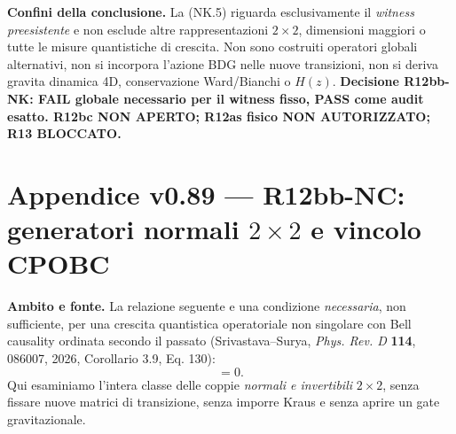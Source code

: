 \documentclass[11pt,a4paper]{article}
\begin{document}
\textbf{Confini della conclusione.} La (NK.5) riguarda esclusivamente il \emph{witness preesistente} e non esclude altre rappresentazioni $2\times2$, dimensioni maggiori o tutte le misure quantistiche di crescita. Non sono costruiti operatori globali alternativi, non si incorpora l'azione BDG nelle nuove transizioni, non si deriva gravita dinamica 4D, conservazione Ward/Bianchi o $H(z)$. \textbf{Decisione R12bb-NK: FAIL globale necessario per il witness fisso, PASS come audit esatto. R12bc NON APERTO; R12as fisico NON AUTORIZZATO; R13 BLOCCATO.}

\clearpage
\section*{Appendice v0.89 --- R12bb-NC: generatori normali $2\times2$ e vincolo CPOBC}
\textbf{Ambito e fonte.} La relazione seguente e una condizione \emph{necessaria}, non sufficiente, per una crescita quantistica operatoriale non singolare con Bell causality ordinata secondo il passato (Srivastava--Surya, \emph{Phys. Rev. D} \textbf{114}, 086007, 2026, Corollario 3.9, Eq. 130):
\begin{equation}
[Q_1Q_2^{-1},\,Q_1^{-1}Q_2]=0. \tag{NC.1}
\end{equation}
Qui esaminiamo l'intera classe delle coppie \emph{normali e invertibili} $2\times2$, senza fissare nuove matrici di transizione, senza imporre Kraus e senza aprire un gate gravitazionale.
\end{document}
